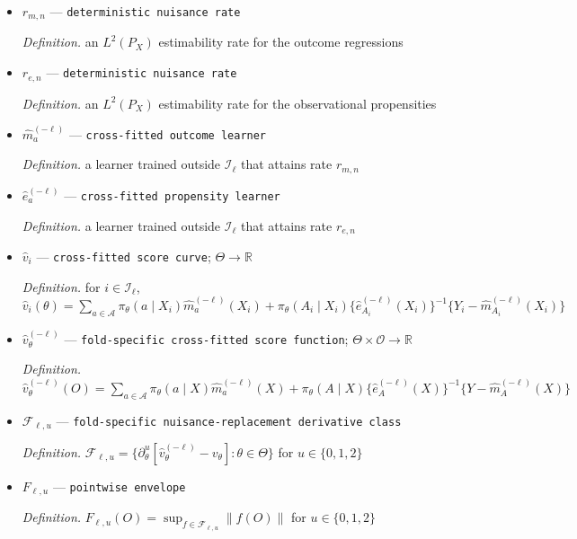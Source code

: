 \documentclass{article}
\begin{document}
\begin{itemize}
  \item \(r_{m,n}\) --- \texttt{deterministic nuisance rate}
  \par\smallskip\noindent\emph{Definition.} an \(L^2(P_X)\) estimability rate for the outcome regressions
  \item \(r_{e,n}\) --- \texttt{deterministic nuisance rate}
  \par\smallskip\noindent\emph{Definition.} an \(L^2(P_X)\) estimability rate for the observational propensities
  \item \(\widehat m_a^{(-\ell)}\) --- \texttt{cross-\allowbreak{}fitted outcome learner}
  \par\smallskip\noindent\emph{Definition.} a learner trained outside \(\mathcal I_\ell\) that attains rate \(r_{m,n}\)
  \item \(\widehat e_a^{(-\ell)}\) --- \texttt{cross-\allowbreak{}fitted propensity learner}
  \par\smallskip\noindent\emph{Definition.} a learner trained outside \(\mathcal I_\ell\) that attains rate \(r_{e,n}\)
  \item \(\widehat v_i\) --- \texttt{cross-\allowbreak{}fitted score curve}; \(\Theta\to\mathbb R\)
  \par\smallskip\noindent\emph{Definition.} for \(i\in\mathcal I_\ell\), \(\widehat v_i(\theta)=\sum_{a\in\mathcal A}\pi_\theta(a\mid X_i)\widehat m_a^{(-\ell)}(X_i)+\pi_\theta(A_i\mid X_i)\{\widehat e_{A_i}^{(-\ell)}(X_i)\}^{-1}\{Y_i-\widehat m_{A_i}^{(-\ell)}(X_i)\}\)
  \item \(\widehat v_\theta^{(-\ell)}\) --- \texttt{fold-\allowbreak{}specific cross-\allowbreak{}fitted score function}; \(\Theta\times\mathcal O\to\mathbb R\)
  \par\smallskip\noindent\emph{Definition.} \(\widehat v_\theta^{(-\ell)}(O)=\sum_{a\in\mathcal A}\pi_\theta(a\mid X)\widehat m_a^{(-\ell)}(X)+\pi_\theta(A\mid X)\{\widehat e_A^{(-\ell)}(X)\}^{-1}\{Y-\widehat m_A^{(-\ell)}(X)\}\)
  \item \(\mathcal F_{\ell,u}\) --- \texttt{fold-\allowbreak{}specific nuisance-\allowbreak{}replacement derivative class}
  \par\smallskip\noindent\emph{Definition.} \(\mathcal F_{\ell,u}=\{\partial_\theta^u[\widehat v_\theta^{(-\ell)}-v_\theta]:\theta\in\Theta\}\) for \(u\in\{0,1,2\}\)
  \item \(F_{\ell,u}\) --- \texttt{pointwise envelope}
  \par\smallskip\noindent\emph{Definition.} \(F_{\ell,u}(O)=\sup_{f\in\mathcal F_{\ell,u}}\|f(O)\|\) for \(u\in\{0,1,2\}\)

\end{itemize}
\end{document}
